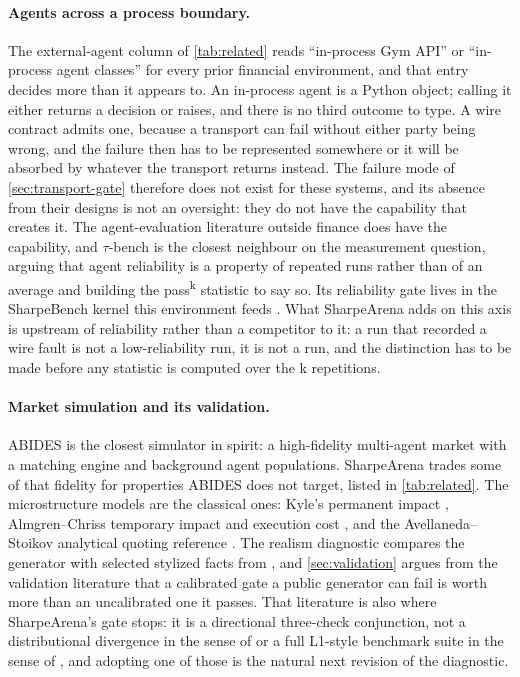 \paragraph{Agents across a process boundary.} The external-agent column of \cref{tab:related} reads ``in-process Gym API'' or ``in-process agent classes'' for every prior financial environment, and that entry decides more than it appears to. An in-process agent is a Python object; calling it either returns a decision or raises, and there is no third outcome to type. A wire contract admits one, because a transport can fail without either party being wrong, and the failure then has to be represented somewhere or it will be absorbed by whatever the transport returns instead. The failure mode of \cref{sec:transport-gate} therefore does not exist for these systems, and its absence from their designs is not an oversight: they do not have the capability that creates it. The agent-evaluation literature outside finance does have the capability, and $\tau$-bench \citep{yao2024taubench} is the closest neighbour on the measurement question, arguing that agent reliability is a property of repeated runs rather than of an average and building the pass\textsuperscript{k} statistic to say so. Its reliability gate lives in the SharpeBench kernel this environment feeds \citep{toca2026sharpebench}. What SharpeArena adds on this axis is upstream of reliability rather than a competitor to it: a run that recorded a wire fault is not a low-reliability run, it is not a run, and the distinction has to be made before any statistic is computed over the k repetitions.

\paragraph{Market simulation and its validation.} ABIDES \citep{byrd2020abides} is the closest simulator in spirit: a high-fidelity multi-agent market with a matching engine and background agent populations. SharpeArena trades some of that fidelity for properties ABIDES does not target, listed in \cref{tab:related}. The microstructure models are the classical ones: Kyle's permanent impact \citep{kyle1985continuous}, Almgren--Chriss temporary impact and execution cost \citep{almgren2001optimal}, and the Avellaneda--Stoikov analytical quoting reference \citep{avellaneda2008high}. The realism diagnostic compares the generator with selected stylized facts from \citet{cont2001empirical}, and \cref{sec:validation} argues from the validation literature \citep{platt2018agent,fagiolo2019validation,lamperti2018information,vyetrenko2020getreal,nagy2025lobbench} that a calibrated gate a public generator can fail is worth more than an uncalibrated one it passes. That literature is also where SharpeArena's gate stops: it is a directional three-check conjunction, not a distributional divergence in the sense of \citet{lamperti2018information} or a full L1-style benchmark suite in the sense of \citet{nagy2025lobbench}, and adopting one of those is the natural next revision of the diagnostic.

